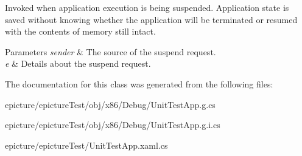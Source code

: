 Invoked when application execution is being suspended. Application state is saved without knowing whether the application will be terminated or resumed with the contents of memory still intact. 


\begin{DoxyParams}{Parameters}
{\em sender} & The source of the suspend request.\\
\hline
{\em e} & Details about the suspend request.\\
\hline
\end{DoxyParams}


The documentation for this class was generated from the following files\+:\begin{DoxyCompactItemize}
\item 
epicture/epicture\+Test/obj/x86/\+Debug/Unit\+Test\+App.\+g.\+cs\item 
epicture/epicture\+Test/obj/x86/\+Debug/Unit\+Test\+App.\+g.\+i.\+cs\item 
epicture/epicture\+Test/Unit\+Test\+App.\+xaml.\+cs\end{DoxyCompactItemize}
